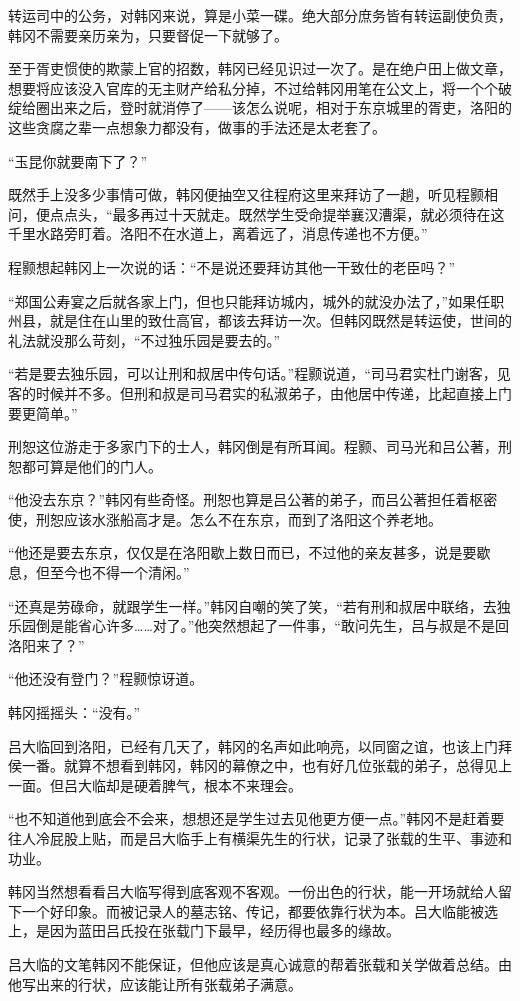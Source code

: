 转运司中的公务，对韩冈来说，算是小菜一碟。绝大部分庶务皆有转运副使负责，韩冈不需要亲历亲为，只要督促一下就够了。

至于胥吏惯使的欺蒙上官的招数，韩冈已经见识过一次了。是在绝户田上做文章，想要将应该没入官库的无主财产给私分掉，不过给韩冈用笔在公文上，将一个个破绽给圈出来之后，登时就消停了——该怎么说呢，相对于东京城里的胥吏，洛阳的这些贪腐之辈一点想象力都没有，做事的手法还是太老套了。

“玉昆你就要南下了？”

既然手上没多少事情可做，韩冈便抽空又往程府这里来拜访了一趟，听见程颢相问，便点点头，“最多再过十天就走。既然学生受命提举襄汉漕渠，就必须待在这千里水路旁盯着。洛阳不在水道上，离着远了，消息传递也不方便。”

程颢想起韩冈上一次说的话：“不是说还要拜访其他一干致仕的老臣吗？”

“郑国公寿宴之后就各家上门，但也只能拜访城内，城外的就没办法了，”如果任职州县，就是住在山里的致仕高官，都该去拜访一次。但韩冈既然是转运使，世间的礼法就没那么苛刻，“不过独乐园是要去的。”

“若是要去独乐园，可以让刑和叔居中传句话。”程颢说道，“司马君实杜门谢客，见客的时候并不多。但刑和叔是司马君实的私淑弟子，由他居中传递，比起直接上门要更简单。”

刑恕这位游走于多家门下的士人，韩冈倒是有所耳闻。程颢、司马光和吕公著，刑恕都可算是他们的门人。

“他没去东京？”韩冈有些奇怪。刑恕也算是吕公著的弟子，而吕公著担任着枢密使，刑恕应该水涨船高才是。怎么不在东京，而到了洛阳这个养老地。

“他还是要去东京，仅仅是在洛阳歇上数日而已，不过他的亲友甚多，说是要歇息，但至今也不得一个清闲。”

“还真是劳碌命，就跟学生一样。”韩冈自嘲的笑了笑，“若有刑和叔居中联络，去独乐园倒是能省心许多……对了。”他突然想起了一件事，“敢问先生，吕与叔是不是回洛阳来了？”

“他还没有登门？”程颢惊讶道。

韩冈摇摇头：“没有。”

吕大临回到洛阳，已经有几天了，韩冈的名声如此响亮，以同窗之谊，也该上门拜侯一番。就算不想看到韩冈，韩冈的幕僚之中，也有好几位张载的弟子，总得见上一面。但吕大临却是硬着脾气，根本不来理会。

“也不知道他到底会不会来，想想还是学生过去见他更方便一点。”韩冈不是赶着要往人冷屁股上贴，而是吕大临手上有横渠先生的行状，记录了张载的生平、事迹和功业。

韩冈当然想看看吕大临写得到底客观不客观。一份出色的行状，能一开场就给人留下一个好印象。而被记录人的墓志铭、传记，都要依靠行状为本。吕大临能被选上，是因为蓝田吕氏投在张载门下最早，经历得也最多的缘故。

吕大临的文笔韩冈不能保证，但他应该是真心诚意的帮着张载和关学做着总结。由他写出来的行状，应该能让所有张载弟子满意。


